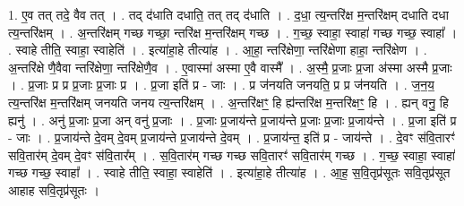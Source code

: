 \documentclass[17pt]{extarticle}
\begin{document}
1. ए॒व तत् तदे॒ वैव तत् । . तद् द॑धाति दधाति॒ तत् तद् द॑धाति । . द॒धा॒ त्य॒न्तरि॑क्ष म॒न्तरि॑क्षम् दधाति दधा त्य॒न्तरि॑क्षम् । . अ॒न्तरि॑क्षम् गच्छ गच्छा॒ न्तरि॑क्ष म॒न्तरि॑क्षम् गच्छ । . ग॒च्छ॒ स्वाहा॒ स्वाहा॑ गच्छ गच्छ॒ स्वाहा᳚ । . स्वाहे तीति॒ स्वाहा॒ स्वाहेति॑ । . इत्या॑हा॒हे तीत्या॑ह । . आ॒हा॒ न्तरि॑क्षेणा॒ न्तरि॑क्षेणा हाहा॒ न्तरि॑क्षेण । . अ॒न्तरि॑क्षे णै॒वैवा न्तरि॑क्षेणा॒ न्तरि॑क्षेणै॒व । . ए॒वास्मा॑ अस्मा ए॒वै वास्मै᳚ । . अ॒स्मै॒ प्र॒जाः प्र॒जा अ॑स्मा अस्मै प्र॒जाः । . प्र॒जाः प्र प्र प्र॒जाः प्र॒जाः प्र । . प्र॒जा इति॑ प्र - जाः । . प्र ज॑नयति जनयति॒ प्र प्र ज॑नयति । . ज॒न॒य॒ त्य॒न्तरि॑क्ष म॒न्तरि॑क्षम् जनयति जनय त्य॒न्तरि॑क्षम् । . अ॒न्तरि॑क्षꣳ॒॒ हि ह्य॑न्तरि॑क्ष म॒न्तरि॑क्षꣳ॒॒ हि । . ह्यन् वनु॒ हि ह्यनु॑ । . अनु॑ प्र॒जाः प्र॒जा अन् वनु॑ प्र॒जाः । . प्र॒जाः प्र॒जाय॑न्ते प्र॒जाय॑न्ते प्र॒जाः प्र॒जाः प्र॒जाय॑न्ते । . प्र॒जा इति॑ प्र - जाः । . प्र॒जाय॑न्ते दे॒वम् दे॒वम् प्र॒जाय॑न्ते प्र॒जाय॑न्ते दे॒वम् । . प्र॒जाय॑न्त॒ इति॑ प्र - जाय॑न्ते । . दे॒वꣳ स॑वि॒तारꣳ॑ सवि॒तार॑म् दे॒वम् दे॒वꣳ स॑वि॒तार᳚म् । . स॒वि॒तार॑म् गच्छ गच्छ सवि॒तारꣳ॑ सवि॒तार॑म् गच्छ । . ग॒च्छ॒ स्वाहा॒ स्वाहा॑ गच्छ गच्छ॒ स्वाहा᳚ । . स्वाहे तीति॒ स्वाहा॒ स्वाहेति॑ । . इत्या॑हा॒हे तीत्या॑ह । . आ॒ह॒ स॒वि॒तृप्र॑सूतः सवि॒तृप्र॑सूत आहाह सवि॒तृप्र॑सूतः । \newline
\end{document}
